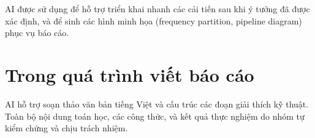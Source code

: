 AI được sử dụng để hỗ trợ triển khai nhanh các cải tiến sau khi ý tưởng đã được xác định, và để sinh các hình minh họa (frequency partition, pipeline diagram) phục vụ báo cáo.

\section*{Trong quá trình viết báo cáo}

AI hỗ trợ soạn thảo văn bản tiếng Việt và cấu trúc các đoạn giải thích kỹ thuật. Toàn bộ nội dung toán học, các công thức, và kết quả thực nghiệm do nhóm tự kiểm chứng và chịu trách nhiệm.
